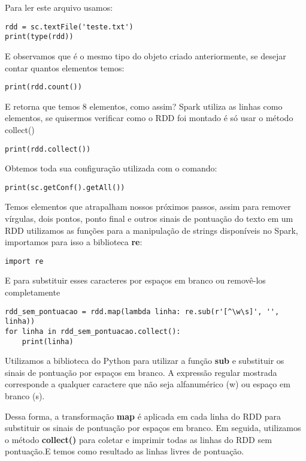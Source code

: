 Para ler este arquivo usamos:
\begin{lstlisting}[]
rdd = sc.textFile('teste.txt')
print(type(rdd))
\end{lstlisting}

E observamos que é o mesmo tipo do objeto criado anteriormente, se desejar contar quantos elementos temos:
\begin{lstlisting}[]
print(rdd.count())
\end{lstlisting}

E retorna que temos 8 elementos, como assim? Spark utiliza as linhas como elementos, se quisermos verificar como o RDD foi montado é só usar o método collect()
\begin{lstlisting}[]
print(rdd.collect())
\end{lstlisting}

Obtemos toda sua configuração utilizada com o comando:
\begin{lstlisting}[]
print(sc.getConf().getAll())
\end{lstlisting}

Temos elementos que atrapalham nossos próximos passos, assim para remover vírgulas, dois pontos, ponto final e outros sinais de pontuação do texto em um RDD utilizamos as funções para a manipulação de strings disponíveis no Spark, importamos para isso a biblioteca \textbf{re}:
\begin{lstlisting}[]
import re
\end{lstlisting}

E para substituir esses caracteres por espaços em branco ou removê-los completamente
\begin{lstlisting}[]
rdd_sem_pontuacao = rdd.map(lambda linha: re.sub(r'[^\w\s]', '', linha))
for linha in rdd_sem_pontuacao.collect():
    print(linha)
\end{lstlisting}

Utilizamos a biblioteca do Python para utilizar a função \textbf{sub} e substituir os sinais de pontuação por espaços em branco. A expressão regular mostrada corresponde a qualquer caractere que não seja alfanumérico (w) ou espaço em branco (s).

Dessa forma, a transformação \textbf{map} é aplicada em cada linha do RDD para substituir os sinais de pontuação por espaços em branco. Em seguida, utilizamos o método \textbf{collect()} para coletar e imprimir todas as linhas do RDD sem pontuação.E temos como resultado as linhas livres de pontuação.

